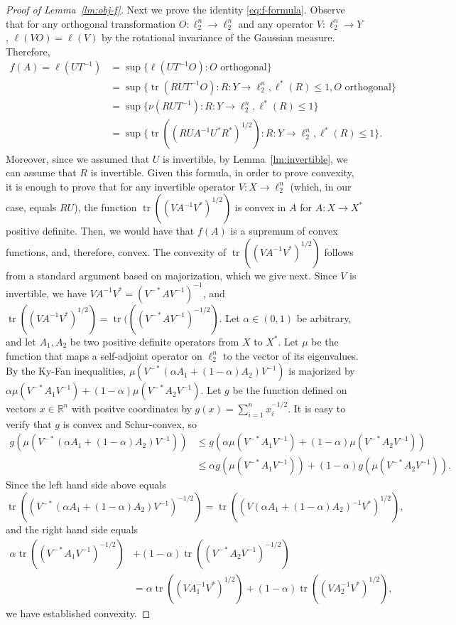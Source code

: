 \documentclass[11pt]{article}
\newcommand{\R}{{\mathbb{R}}}
\DeclareMathOperator{\tr}{tr}
\begin{document}
\begin{proof}[Proof of Lemma~\ref{lm:obj-f}]
  Next we prove the identity \eqref{eq:f-formula}. Observe that for
  any orthogonal transformation $O:\ell_2^n \to \ell_2^n$ and any
  operator $V: \ell_2^n \to Y$, $\ell(VO) = \ell(V)$ by the
  rotational invariance of the Gaussian measure. Therefore,
  \begin{align*}
  f(A) = \ell(UT^{-1}) &= \sup\{\ell(UT^{-1}O): O \text{ orthogonal}\}\\
  &= \sup\{\tr(RUT^{-1}O): R:Y\to\ell_2^n, \ell^*(R) \le 1, O \text{ orthogonal}\}\\
  &= \sup\{\nu(RUT^{-1}): R:Y\to\ell_2^n, \ell^*(R) \le 1\}\\
  &= \sup\{\tr((RUA^{-1}U^*R^*)^{1/2}): R:Y\to\ell_2^n, \ell^*(R) \le  1\}. 
  \end{align*}
  Moreover, since we assumed that $U$ is invertible, by
  Lemma~\ref{lm:invertible}, we can assume that $R$ is invertible.
  Given this formula, in order to prove convexity, it is enough to
  prove that for any invertible operator $V:X \to \ell^n_2$ (which, in
  our case, equals $RU$), the function $\tr((VA^{-1}V^*)^{1/2})$ is
  convex in $A$ for $A:X\to X^*$ positive definite. Then, we would
  have that $f(A)$ is a supremum of convex functions, and, therefore,
  convex.  The convexity of $\tr((VA^{-1}V^*)^{1/2})$ follows from a
  standard argument based on majorization, which we give next.  Since
  $V$ is invertible, we have $VA^{-1}V^* = (V^{-*}AV^{-1})^{-1}$, and
  $\tr((VA^{-1}V^*)^{1/2}) = \tr(((V^{-*}AV^{-1})^{-1/2})$. Let
  $\alpha \in (0,1)$ be arbitrary, and let $A_1, A_2$ be two positive
  definite operators from $X$ to $X^*$. Let $\mu$ be the function that
  maps a self-adjoint operator on $\ell_2^n$ to the vector of its
  eigenvalues. By the Ky-Fan inequalities, $\mu(V^{-*}(\alpha A_1 +
  (1-\alpha)A_2)V^{-1})$ is majorized by $\alpha \mu(V^{-*}A_1V^{-1}) + (1-\alpha)
  \mu(V^{-*}A_2V^{-1})$. Let $g$ be the function defined on vectors $x \in
  \R^n$ with positve coordinates by $g(x) =
  \sum_{i=1}^n{x_i^{-1/2}}$. It is easy to verify that $g$ is convex
  and Schur-convex, so
  \begin{align*}
  g(\mu(V^{-*}(\alpha A_1 + (1-\alpha)A_2)V^{-1}))
  &\le
  g(\alpha \mu(V^{-*}A_1V^{-1}) + (1-\alpha) \mu(V^{-*}A_2V^{-1}))\\
  &\le 
  \alpha g(\mu(V^{-*}A_1V^{-1})) + (1-\alpha) g(\mu(V^{-*}A_2V^{-1})).
  \end{align*}
  Since the left hand side above equals   
  \[
  \tr((V^{-*}(\alpha A_1 + (1-\alpha)A_2)V^{-1})^{-1/2})
  = 
  \tr((V(\alpha A_1 + (1-\alpha)A_2)^{-1}V^*)^{1/2}),
  \]
  and the right hand side equals
  \begin{align*}
  \alpha \tr((V^{-*}A_1V^{-1})^{-1/2}) &+  (1- \alpha) \tr((V^{-*}A_2V^{-1})^{-1/2})\\
  &= 
  \alpha \tr((VA_1^{-1}V^*)^{1/2}) +  (1- \alpha) \tr((VA_2^{-1}V^*)^{1/2}),
  \end{align*}
  we have established convexity.   
 


\end{proof}
\end{document}
